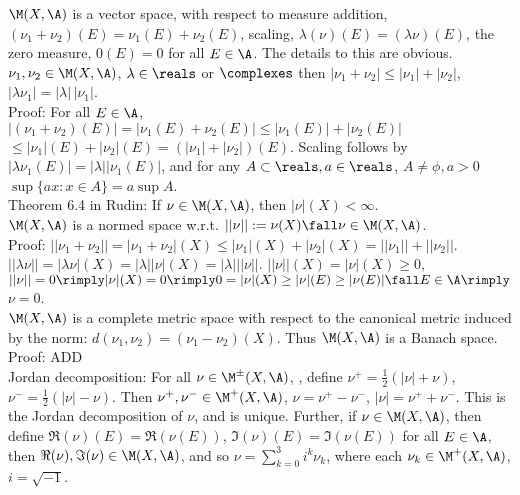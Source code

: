 $\M(X, \A)$ is a vector space, with respect to measure addition, $(\nu_1 + \nu_2)(E) = \nu_1(E) + \nu_2(E)$, scaling, $\lambda(\nu)(E) = (\lambda \nu)(E)$, the zero measure, $0(E) = 0$ for all $E \in \A$. The details to this are obvious.\\

$\nu_1, \nu_2 \in \M(X, \A)$, $\lambda \in \reals$ or $\complexes$ then $|\nu_1 + \nu_2| \le |\nu_1| + |\nu_2|$, $|\lambda \nu_1| = |\lambda| \, |\nu_1|$. \\

\noindent
Proof: For all $E \in \A$, $|(\nu_1 + \nu_2)(E)| = |\nu_1(E) + \nu_2(E)| \le |\nu_1(E)| + |\nu_2(E)|$ 
$\le |\nu_1|(E) + |\nu_2|(E) = (|\nu_1| + |\nu_2|)(E)$. Scaling follows by $|\lambda \nu_1(E)| = |\lambda| |\nu_1(E)|$, and for any $A \subset \reals, a \in \reals$, $A \not = \phi, a > 0$   $\sup \{ a x: x \in A \} = a \sup A$.\\


Theorem 6.4 in Rudin: If $\nu \in \M(X, \A)$, then $|\nu|(X) < \infty$. \\

$\M(X, \A)$ is a normed space w.r.t. $||\nu|| := \nu(X) \fall \nu \in \M(X, \A)$. \\

\noindent
Proof: $|| \nu_1 + \nu_2 || = |\nu_1 + \nu_2|(X) \le |\nu_1|(X) + |\nu_2|(X) = ||\nu_1|| + ||\nu_2|| $. $||\lambda \nu|| = |\lambda \nu|(X) = |\lambda| |\nu|(X) = |\lambda| ||\nu||$. $||\nu||(X) = |\nu|(X) \ge 0$, $||\nu|| = 0 \rimply |\nu|(X) = 0 \rimply 0 = |\nu|(X) \ge |\nu|(E) \ge |\nu(E)| \fall E \in \A \rimply$ $\nu = 0$. \\

$\M(X, \A)$ is a complete metric space with respect to the canonical metric induced by the norm: $d(\nu_1,\nu_2) = (\nu_1-\nu_2)(X)$. Thus $\M(X, \A)$ is a Banach space. \\

\noindent
Proof: ADD \\

Jordan decomposition: For all $ \nu \in \M^\pm(X, \A)$, , define $\nu^+ = \frac{1}{2}(|\nu| + \nu)$, $\nu^- = \frac{1}{2}(|\nu| - \nu)$. Then $\nu^+, \nu^- \in  \M^+(X, \A)$, $\nu = \nu^+ - \nu^-$, $|\nu| = \nu^+ + \nu^-$. This is the Jordan decomposition of $\nu$, and is unique. Further, if $\nu \in \M(X, \A)$, then define $\Re(\nu)(E) = \Re(\nu(E))$, $\Im(\nu)(E) = \Im(\nu(E))$ for all $E \in \A$, then $\Re(\nu), \Im(\nu) \in \M(X, \A)$, and so $\nu = \sum_{k=0}^3 i^k \nu_k$, where each $\nu_k \in \M^+(X, \A)$, $i = \sqrt{-1}$.\\

